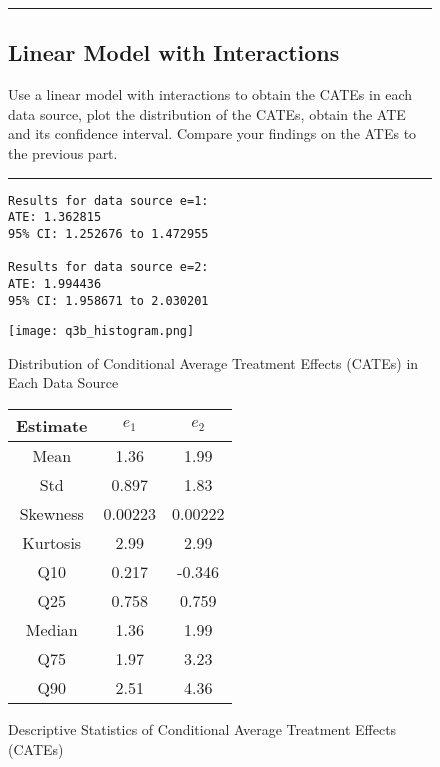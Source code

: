 \documentclass{article}
\newenvironment{colorparagraph}[1]{\par\color{#1}}{\par}
\begin{document}
\begin{figure}[H]
  \begin{colorparagraph}{questioncolor}
  \rule{\textwidth}{0.5pt}
  \label{q3b}
  \subsection{Linear Model with Interactions}

  Use a linear model with interactions to obtain the CATEs in each data source, plot the distribution of the CATEs, obtain the ATE and its confidence interval. Compare your findings on the ATEs to the previous part.

  \rule{\textwidth}{0.5pt}
  \end{colorparagraph}
\end{figure}

\begin{figure}[H]
  \begin{lstlisting}[style=RstyleComment, caption=ATE and Confidence Interval Estimates Ignoring Covariates]
Results for data source e=1:
ATE: 1.362815 
95% CI: 1.252676 to 1.472955 

Results for data source e=2:
ATE: 1.994436 
95% CI: 1.958671 to 2.030201
  \end{lstlisting}
\end{figure}


\begin{figure}[H]
  \centering
  \texttt{[image: q3b\_histogram.png]}
  \caption{Distribution of Conditional Average Treatment Effects (CATEs) in Each Data Source}
\end{figure}

\begin{figure}
  \begin{center}
    \renewcommand{\arraystretch}{1.5}
    \begin{tabular}{|c|c|c|}
      \hline
      \textbf{Estimate} & $e_1$ & $e_2$ \\ \hline
      Mean     & 1.36    &  1.99    \\ \hline
      Std      & 0.897   &  1.83    \\ \hline
      Skewness & 0.00223 &  0.00222 \\ \hline
      Kurtosis & 2.99    &  2.99    \\ \hline
      Q10      & 0.217   & -0.346   \\ \hline
      Q25      & 0.758   &  0.759   \\ \hline
      Median   & 1.36    &  1.99    \\ \hline
      Q75      & 1.97    &  3.23    \\ \hline
      Q90      & 2.51    &  4.36    \\ \hline
    \end{tabular}
  \end{center}
  \caption{Descriptive Statistics of Conditional Average Treatment Effects (CATEs)}
\end{figure}
\end{document}
